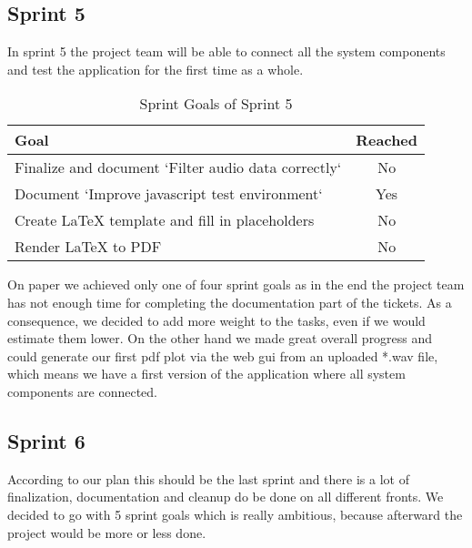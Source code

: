\subsection{Sprint 5}\label{subsec:sprint-5}
In sprint 5 the project team will be able to connect all the system components and test the application for the first time as a whole.
\begin{table}[H]
    \centering
    \begin{tabularx}{\textwidth}{X c}
        \toprule
        \textbf{Goal}                                         & \textbf{Reached} \\
        \midrule
        Finalize and document `Filter audio data correctly`   & No               \\
        \midrule
        Document `Improve javascript test environment`        & Yes              \\
        \midrule
        Create LaTeX template and fill in placeholders        & No               \\
        \midrule
        Render LaTeX to PDF                                   & No               \\
        \bottomrule
    \end{tabularx}
    \caption{Sprint Goals of Sprint 5}\label{tab:sprint_goals5}
\end{table}
On paper we achieved only one of four sprint goals as in the end the project team has not enough time for completing
the documentation part of the tickets.
As a consequence, we decided to add more weight to the tasks, even if we would estimate them lower.
On the other hand we made great overall progress and could generate our first pdf plot via the web gui from an uploaded
*.wav file, which means we have a first version of the application where all system components are connected.

\subsection{Sprint 6}\label{subsec:sprint-6}
According to our plan this should be the last sprint and there is a lot of finalization,
documentation and cleanup do be done on all different fronts.
We decided to go with 5 sprint goals which is really ambitious, because afterward the project would be more or less done.

